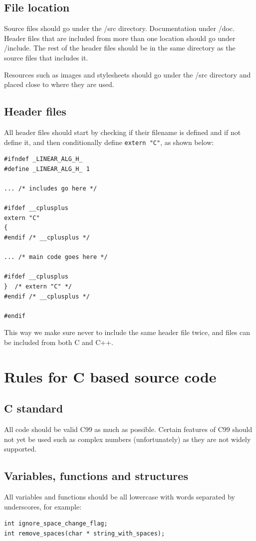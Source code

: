 \documentclass[12pt]{article}
\newenvironment{sourcestyle}{}{}%
\begin{document}
\subsection{File location}
Source files should go under the /src directory. Documentation under /doc. 
Header files that are included from more than one location should go under /include. 
The rest of the header files should be in the same directory as the source files that includes it.

Resources such as images and stylesheets should go under the /src directory and placed close to where they are used.

\subsection{Header files}
All header files should start by checking if their filename is defined
and if not define it, and then conditionally define {\tt extern "C"},  as shown below:
\begin{sourcestyle}
\begin{verbatim}
#ifndef _LINEAR_ALG_H_
#define _LINEAR_ALG_H_ 1

... /* includes go here */

#ifdef __cplusplus
extern "C"
{
#endif /* __cplusplus */

... /* main code goes here */

#ifdef __cplusplus
}  /* extern "C" */
#endif /* __cplusplus */

#endif
\end{verbatim}
\end{sourcestyle}
This way we make sure never to include the same header file twice, and files can be included
from both C and C++.

\section{Rules for C based source code}
\subsection{C standard}
All code should be valid C99 as much as possible. Certain features of C99 should not yet 
be used such as complex numbers (unfortunately) as they are not widely supported.

\subsection{Variables, functions and structures}
All variables and functions should be all lowercase with words separated by underscores, 
for example:
\begin{sourcestyle}
\begin{verbatim}
int ignore_space_change_flag;
int remove_spaces(char * string_with_spaces);
\end{verbatim}
\end{sourcestyle}
\end{document}
